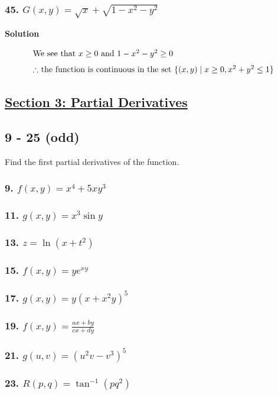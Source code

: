 \documentclass{article}
\newcommand{\such}{\; | \;}
\begin{document}
\subsubsection*{45. $G(x,y) = \sqrt x + \sqrt{1 - x^2 - y^2}$}
\centerline{\textbf{Solution}}
\begin{align*}
    \intertext{We see that $x\geq 0$ and $1-x^2-y^2\geq 0$}
    \intertext{$\therefore$ the function is continuous in the set $\{(x,y)\such x\geq 0, x^2+y^2\leq 1\}$}
\end{align*}
\newpage
\begin{center}
    \section*{\underline{Section 3: Partial Derivatives}}
\end{center}
\subsection*{9 - 25 (odd)}
Find the first partial derivatives of the function.
\subsubsection*{9. $f(x,y) = x^4 + 5xy^3$}
\subsubsection*{11. $g(x,y) = x^3 \sin y$}
\subsubsection*{13. $z = \ln (x + t^2)$}
\subsubsection*{15. $f(x,y) = ye^{xy}$}
\subsubsection*{17. $g(x,y) = y(x + x^2 y)^5$}
\subsubsection*{19. $f(x,y) = \displaystyle\frac{ax + by}{cx + dy}$}
\subsubsection*{21. $g(u, v) = (u^2v-v^3)^5$}
\subsubsection*{23. $R(p, q) = \tan^{-1} (pq^2)$}
\end{document}
